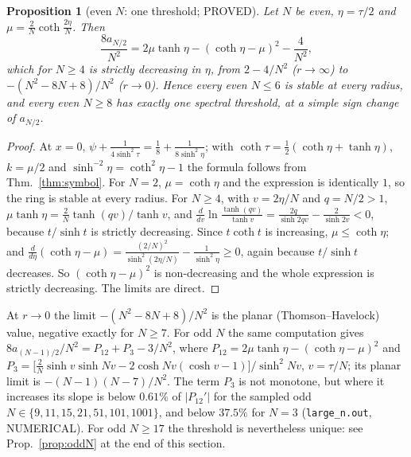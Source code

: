 \documentclass[11pt]{article}
\newtheorem{proposition}[theorem]{Proposition}
\theoremstyle{remark}
\begin{document}
\begin{proposition}[even $N$: one threshold; PROVED]\label{prop:evenN}
Let $N$ be even, $\eta=\tau/2$ and $\mu=\frac2N\coth\frac{2\eta}N$. Then
\[
\frac{8a_{N/2}}{N^2}=2\mu\tanh\eta-(\coth\eta-\mu)^2-\frac4{N^2},
\]
which for $N\ge4$ is strictly decreasing in $\eta$, from $2-4/N^2$ ($r\to\infty$) to $-(N^2-8N+8)/N^2$ ($r\to0$). Hence
every even $N\le6$ is stable at every radius, and every even $N\ge8$ has exactly one spectral threshold, at a simple
sign change of $a_{N/2}$.
\end{proposition}
\begin{proof}
At $x=0$, $\psi+\frac1{4\sinh^2\tau}=\frac18+\frac1{8\sinh^2\eta}$; with $\coth\tau=\frac12(\coth\eta+\tanh\eta)$, $k=\mu/2$ and
$\sinh^{-2}\eta=\coth^2\eta-1$ the formula follows from Thm.~\ref{thm:symbol}. For $N=2$, $\mu=\coth\eta$ and the
expression is identically $1$, so the ring is stable at every radius. For $N\ge4$, with $v=2\eta/N$ and $q=N/2>1$,
$\mu\tanh\eta=\frac2N\tanh(qv)/\tanh v$, and $\frac d{dv}\ln\frac{\tanh(qv)}{\tanh v}=\frac{2q}{\sinh2qv}-\frac2{\sinh2v}<0$,
because $t/\sinh t$ is strictly decreasing. Since $t\coth t$ is increasing, $\mu\le\coth\eta$; and
$\frac d{d\eta}(\coth\eta-\mu)=\frac{(2/N)^2}{\sinh^2(2\eta/N)}-\frac1{\sinh^2\eta}\ge0$, again because $t/\sinh t$ decreases. So
$(\coth\eta-\mu)^2$ is non-decreasing and the whole expression is strictly decreasing. The limits are direct.
\end{proof}
At $r\to0$ the limit $-(N^2-8N+8)/N^2$ is the planar (Thomson--Havelock) value, negative exactly for $N\ge7$. For odd
$N$ the same computation gives $8a_{(N-1)/2}/N^2=P_{12}+P_3-3/N^2$, where $P_{12}=2\mu\tanh\eta-(\coth\eta-\mu)^2$ and
$P_3=\big[\frac2N\sinh v\sinh Nv-2\cosh Nv(\cosh v-1)\big]/\sinh^2Nv$, $v=\tau/N$; its planar limit is $-(N-1)(N-7)/N^2$. The
term $P_3$ is not monotone, but where it increases its slope is below $0.61\%$ of $|P_{12}'|$ for the sampled odd
$N\in\{9,11,15,21,51,101,1001\}$, and below $37.5\%$ for $N=3$ (\texttt{large\_n.out}, NUMERICAL). For odd $N\ge17$ the threshold is nevertheless unique: see Prop.~\ref{prop:oddN} at the end of this section.
\end{document}
